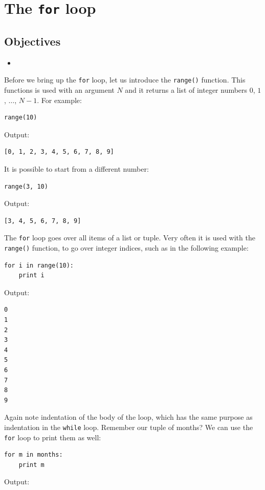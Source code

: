 \section{The {\tt for} loop} \label{sec:forloop}

\subsection{Objectives}

\begin{itemize}
\item
\end{itemize}

Before we bring up the {\tt for} loop, let us introduce the {\tt range()}
function. This functions is used with an argument $N$ and it returns 
a list of integer numbers $0$, $1$, $\ldots$, $N-1$. For example:

\begin{verbatim}
range(10)
\end{verbatim}
Output:

\begin{verbatim}
[0, 1, 2, 3, 4, 5, 6, 7, 8, 9]
\end{verbatim}
It is possible to start from a different number:

\begin{verbatim}
range(3, 10)
\end{verbatim}
Output:

\begin{verbatim}
[3, 4, 5, 6, 7, 8, 9]
\end{verbatim}
The {\tt for} loop goes over all items of a list or tuple.
Very often it is used with the {\tt range()} function, to go over 
integer indices, such as in the following example:

\begin{verbatim}
for i in range(10):
    print i
\end{verbatim}
Output:

\begin{verbatim}
0
1
2
3
4
5
6
7
8
9
\end{verbatim}
Again note indentation of the body of the loop, which has the same 
purpose as indentation in the {\tt while} loop. Remember our tuple
of months? We can use the {\tt for} loop to print them as well:

\begin{verbatim}
for m in months:
    print m
\end{verbatim}
Output:

